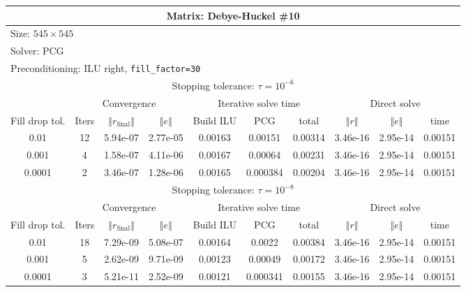 \documentclass[oneside,final]{amsart}  %
\begin{document}
\begin{tabular}{|c|c|c|c|c|c|c|c|c|c|}
\hline
\multicolumn{10}{|c|}{Matrix: Debye-Huckel \#10}\tabularnewline
\hline
  \multicolumn{10}{|l|}{Size: $545\times545$}\tabularnewline
\hline
\multicolumn{10}{|l|}{Solver: PCG}\tabularnewline
\hline
\multicolumn{10}{|l|}{Preconditioning: ILU right, \texttt{fill\_factor=30}}\tabularnewline
\hline
\hline
\multicolumn{10}{|c|}{Stopping tolerance: $\tau=10^{-6}$}\tabularnewline
\hline
\hline
 & \multicolumn{3}{c|}{Convergence} & \multicolumn{3}{c|}{Iterative solve time} & \multicolumn{3}{c|}{Direct solve}\tabularnewline
\hline
Fill drop tol.  & Iters & $\left\Vert r_{\text{final}}\right\Vert $  & $\left\Vert e\right\Vert $  & Build ILU  & PCG  & total  & $\left\Vert r\right\Vert $ & $\left\Vert e\right\Vert $  & time\tabularnewline
\hline
  0.01 & 12 & 5.94e-07 & 2.77e-05 &    0.00163 &    0.00151 &    0.00314 & 3.46e-16 & 2.95e-14 &    0.00151\\
  \hline
  0.001 & 4 & 1.58e-07 & 4.11e-06 &    0.00167 &    0.00064 &    0.00231 & 3.46e-16 & 2.95e-14 &    0.00151\\
  \hline
  0.0001 & 2 & 3.46e-07 & 1.28e-06 &    0.00165 &   0.000384 &    0.00204 & 3.46e-16 & 2.95e-14 &    0.00151\\
  \hline
\hline
\multicolumn{10}{|c|}{Stopping tolerance: $\tau=10^{-8}$}\tabularnewline
\hline
\hline
 & \multicolumn{3}{c|}{Convergence} & \multicolumn{3}{c|}{Iterative solve time} & \multicolumn{3}{c|}{Direct solve }\tabularnewline
\hline
Fill drop tol.  & Iters  & $\left\Vert r_{\text{final}}\right\Vert $  & $\left\Vert e\right\Vert $ & Build ILU  & PCG  & total  & $\left\Vert r\right\Vert $  & $\left\Vert e\right\Vert $  & time\tabularnewline
\hline
  0.01 & 18 & 7.29e-09 & 5.08e-07 &    0.00164 &     0.0022 &    0.00384 & 3.46e-16 & 2.95e-14 &    0.00151\\
  \hline
  0.001 & 5 & 2.62e-09 & 9.71e-09 &    0.00123 &    0.00049 &    0.00172 & 3.46e-16 & 2.95e-14 &    0.00151\\
  \hline
  0.0001 & 3 & 5.21e-11 & 2.52e-09 &    0.00121 &   0.000341 &    0.00155 & 3.46e-16 & 2.95e-14 &    0.00151\\
  \hline
\end{tabular}
\end{document}
